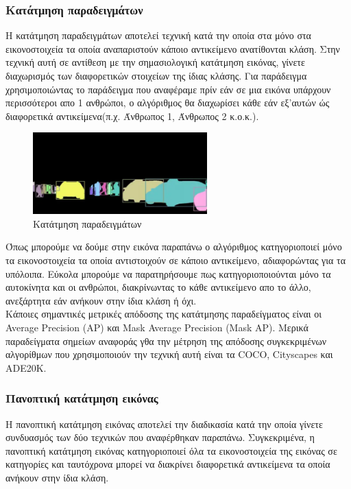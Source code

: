 \documentclass[12pt]{article}
\begin{document}
\subsubsection{Κατάτμηση παραδειγμάτων}
Η κατάτμηση παραδειγμάτων αποτελεί τεχνική κατά την οποία στα μόνο στα εικονοστοιχεία τα οποία αναπαριστούν κάποιο αντικείμενο ανατίθονται κλάση. Στην τεχνική αυτή σε αντίθεση με την σημασιολογική κατάτμηση εικόνας, γίνετε διαχωρισμός των διαφορετικών στοιχείων της ίδιας κλάσης. Για παράδειγμα χρησιμοποιώντας το παράδειγμα που αναφέραμε πρίν εάν σε μια εικόνα υπάρχουν περισσότεροι απο 1 ανθρώποι, ο αλγόριθμος θα διαχωρίσει κάθε εάν εξ'αυτών ώς διαφορετικά αντικείμενα(π.χ. Άνθρωπος 1, Άνθρωπος 2 κ.ο.κ.).

\begin{figure}[h!]
  \centering
  \includegraphics[width=0.6\textwidth]{images/figure2.png} %
  \caption{Κατάτμηση παραδειγμάτων}
  \label{figure 2}
\end{figure}

Όπως μπορούμε να δούμε στην εικόνα παραπάνω ο αλγόριθμος κατηγοριοποιεί μόνο τα εικονοστοιχεία τα οποία αντιστοιχούν σε κάποιο αντικείμενο, αδιαφορώντας για τα υπόλοιπα. Εύκολα μπορούμε να παρατηρήσουμε πως κατηγοριοποιούνται μόνο τα αυτοκίνητα και οι ανθρώποι, διακρίνωντας το κάθε αντικείμενο απο το άλλο, ανεξάρτητα εάν ανήκουν στην ίδια κλάση ή όχι. \\

Κάποιες σημαντικές μετρικές απόδοσης της κατάτμησης παραδείγματος είναι οι Average Precision (AP) και Mask Average Precision (Mask AP). Μερικά παραδείγματα σημείων αναφοράς γθα την μέτρηση της απόδοσης συγκεκριμένων αλγορίθμων που χρησιμοποιούν την τεχνική αυτή είναι τα COCO, Cityscapes και ADE20K.

\subsubsection{Πανοπτική κατάτμηση εικόνας}

Η πανοπτική κατάτμηση εικόνας αποτελεί την διαδικασία κατά την οποία γίνετε συνδυασμός των δύο τεχνικών που αναφέρθηκαν παραπάνω. Συγκεκριμένα, η πανοπτική κατάτμηση εικόνας κατηγοριοποιεί όλα τα εικονοστοιχεία της εικόνας σε κατηγορίες και ταυτόχρονα μπορεί να διακρίνει διαφορετικά αντικείμενα τα οποία ανήκουν στην ίδια κλάση. 
\end{document}
